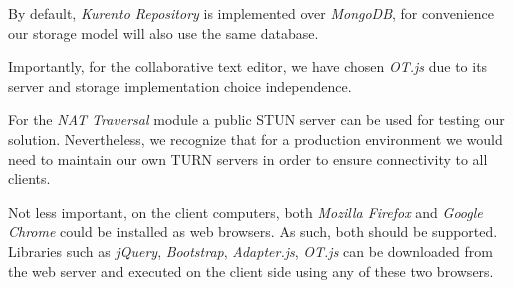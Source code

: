 \documentclass[conference,compsoc,a4paper]{IEEEtran}
\begin{document}
By default, \emph{Kurento Repository} is implemented over \emph{MongoDB}, for convenience our storage model will also use the same database.

Importantly, for the collaborative text editor, we have chosen \emph{OT.js} due to its server and storage implementation choice independence.

For the \emph{NAT Traversal} module a public \gls{STUN} server can be used for testing our solution. Nevertheless, we recognize that for a production environment we would need to maintain our own \gls{TURN} servers in order to ensure connectivity to all clients.

Not less important, on the client computers, both \emph{Mozilla Firefox} and \emph{Google Chrome} could be installed as web browsers. As such, both should be supported. Libraries such as \emph{jQuery}, \emph{Bootstrap}, \emph{Adapter.js}, \emph{OT.js} can be downloaded from the web server and executed on the client side using any of these two browsers.

\begin{table}[H]
\centering
	\caption{Application Architecture}
	\label{table:apparch}

\end{table}

\end{document}
